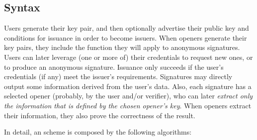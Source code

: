 
\subsection{Syntax}
\label{ssec:syntax-uas}

Users generate their key pair, and then optionally advertise
their public key and conditions for issuance in order to become issuers. When
openers generate their key pairs, they include the function they will apply to
anonymous signatures. Users can later leverage (one or more of) their
credentials to request new ones, or to produce an anonymous signature. Issuance
only succeeds if the user's credentials (if any) meet the issuer's requirements.
Signatures may directly output some information derived from the user's data.
Also, each signature has a selected opener (probably, by the user and/or
verifier), who can later \emph{extract only the information that is defined by
  the chosen opener's key}. When openers extract their information, they also
prove the correctness of the result.

In detail, an \UAS scheme is composed by the following algorithms:

